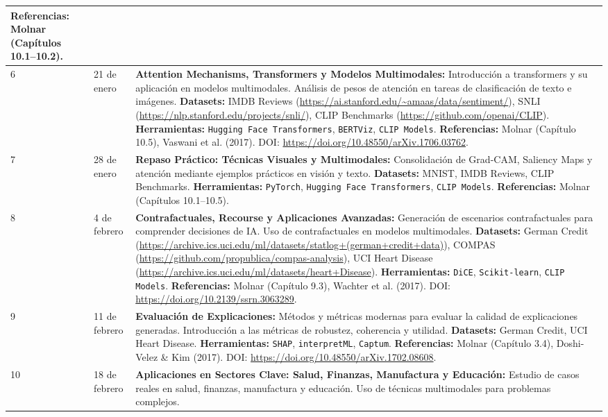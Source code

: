 \begin{longtable}{|p{1.2cm}|p{2.8cm}|p{9.5cm}|}
\textbf{Referencias:} Molnar (Capítulos 10.1–10.2). \\
\hline
6 & 21 de enero & \textbf{Attention Mechanisms, Transformers y Modelos Multimodales:} 
Introducción a transformers y su aplicación en modelos multimodales. Análisis de pesos de atención en tareas de clasificación de texto e imágenes. 
\textbf{Datasets:} IMDB Reviews (\url{https://ai.stanford.edu/~amaas/data/sentiment/}), SNLI (\url{https://nlp.stanford.edu/projects/snli/}), CLIP Benchmarks (\url{https://github.com/openai/CLIP}). 
\textbf{Herramientas:} \texttt{Hugging Face Transformers}, \texttt{BERTViz}, \texttt{CLIP Models}. 
\textbf{Referencias:} Molnar (Capítulo 10.5), Vaswani et al. (2017). DOI: \url{https://doi.org/10.48550/arXiv.1706.03762}. \\
\hline
7 & 28 de enero & \textbf{Repaso Práctico: Técnicas Visuales y Multimodales:} 
Consolidación de Grad-CAM, Saliency Maps y atención mediante ejemplos prácticos en visión y texto. 
\textbf{Datasets:} MNIST, IMDB Reviews, CLIP Benchmarks. 
\textbf{Herramientas:} \texttt{PyTorch}, \texttt{Hugging Face Transformers}, \texttt{CLIP Models}. 
\textbf{Referencias:} Molnar (Capítulos 10.1–10.5). \\
\hline
8 & 4 de febrero & \textbf{Contrafactuales, Recourse y Aplicaciones Avanzadas:} 
Generación de escenarios contrafactuales para comprender decisiones de IA. Uso de contrafactuales en modelos multimodales. 
\textbf{Datasets:} German Credit (\url{https://archive.ics.uci.edu/ml/datasets/statlog+(german+credit+data)}), COMPAS (\url{https://github.com/propublica/compas-analysis}), UCI Heart Disease (\url{https://archive.ics.uci.edu/ml/datasets/heart+Disease}). 
\textbf{Herramientas:} \texttt{DiCE}, \texttt{Scikit-learn}, \texttt{CLIP Models}. 
\textbf{Referencias:} Molnar (Capítulo 9.3), Wachter et al. (2017). DOI: \url{https://doi.org/10.2139/ssrn.3063289}. \\
\hline
9 & 11 de febrero & \textbf{Evaluación de Explicaciones:} 
Métodos y métricas modernas para evaluar la calidad de explicaciones generadas. Introducción a las métricas de robustez, coherencia y utilidad. 
\textbf{Datasets:} German Credit, UCI Heart Disease. 
\textbf{Herramientas:} \texttt{SHAP}, \texttt{interpretML}, \texttt{Captum}. 
\textbf{Referencias:} Molnar (Capítulo 3.4), Doshi-Velez \& Kim (2017). DOI: \url{https://doi.org/10.48550/arXiv.1702.08608}. \\
\hline
10 & 18 de febrero & \textbf{Aplicaciones en Sectores Clave: Salud, Finanzas, Manufactura y Educación:} 
Estudio de casos reales en salud, finanzas, manufactura y educación. Uso de técnicas multimodales para problemas complejos. 

\end{longtable}
